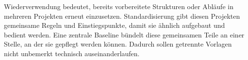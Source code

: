 \begin{beginnerstatement}

Wiederverwendung bedeutet, bereits vorbereitete Strukturen oder Abläufe in
mehreren Projekten erneut einzusetzen. Standardisierung gibt diesen Projekten
gemeinsame Regeln und Einstiegspunkte, damit sie ähnlich aufgebaut und bedient
werden. Eine zentrale Baseline bündelt diese gemeinsamen Teile an einer Stelle,
an der sie gepflegt werden können. Dadurch sollen getrennte Vorlagen nicht
unbemerkt technisch auseinanderlaufen.

\end{beginnerstatement}
